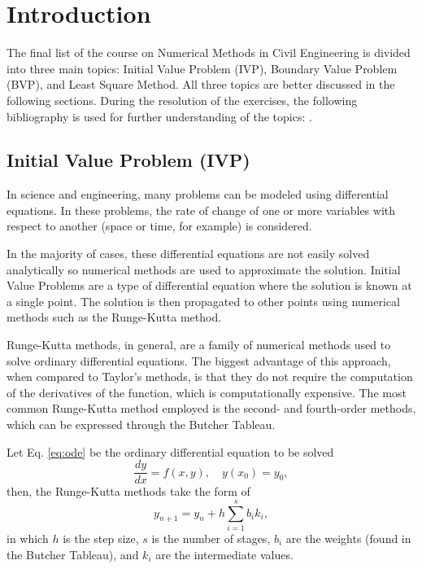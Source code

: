 \section{Introduction}\label{sec:introduction}
The final list of the course on Numerical Methods in Civil Engineering is divided into three main topics: Initial Value Problem (IVP), Boundary Value Problem (BVP), and Least Square Method. All three topics are better discussed in the following sections. During the resolution of the exercises, the following bibliography is used for further understanding of the topics: \cite{de2000metodos,burden1997numerical}.

\subsection{Initial Value Problem (IVP)}\label{subsec:ivp}
In science and engineering, many problems can be modeled using differential equations. In these problems, the rate of change of one or more variables with respect to another (space or time, for example) is considered. 

In the majority of cases, these differential equations are not easily solved analytically so numerical methods are used to approximate the solution. Initial Value Problems are a type of differential equation where the solution is known at a single point. The solution is then propagated to other points using numerical methods such as the Runge-Kutta method.

Runge-Kutta methods, in general, are a family of numerical methods used to solve ordinary differential equations. The biggest advantage of this approach, when compared to Taylor's methods, is that they do not require the computation of the derivatives of the function, which is computationally expensive. The most common Runge-Kutta method employed is the second- and fourth-order methods, which can be expressed through the Butcher Tableau. 

Let Eq. \eqref{eq:ode} be the ordinary differential equation to be solved 
\begin{equation}
    \frac{dy}{dx} = f(x,y), \quad y(x_0) = y_0,
    \label{eq:ode}
\end{equation}
then, the Runge-Kutta methods take the form of 
\begin{equation}
    y_{n+1} = y_n + h\sum_{i=1}^{s}b_ik_i,
\end{equation}
in which $h$ is the step size, $s$ is the number of stages, $b_i$ are the weights (found in the Butcher Tableau), and $k_i$ are the intermediate values. 


